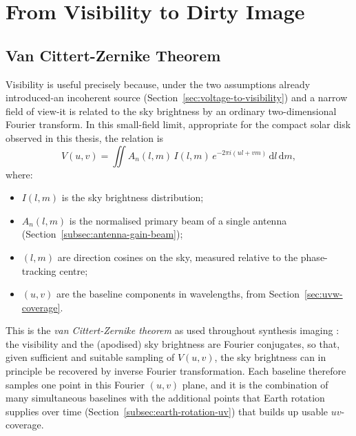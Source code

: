 \section{From Visibility to Dirty Image}
\label{sec:visibility-to-image}

\subsection{Van Cittert-Zernike Theorem}
\label{subsec:vcz}
Visibility is useful precisely because, under the two assumptions already
introduced-an incoherent source (Section~\ref{sec:voltage-to-visibility}) and
a narrow field of view-it is related to the sky brightness by an ordinary
two-dimensional Fourier transform. In this small-field limit, appropriate for
the compact solar disk observed in this thesis, the relation is
\begin{equation}
  V(u,v) = \iint A_n(l,m)\,I(l,m)\,e^{-2\pi i(ul+vm)}\,\mathrm{d}l\,\mathrm{d}m ,
  \label{eq:vcz}
\end{equation}
where:
\begin{itemize}[leftmargin=1.5em,itemsep=1pt,topsep=2pt]
  \item $I(l,m)$ is the sky brightness distribution;
  \item $A_n(l,m)$ is the normalised primary beam of a single antenna
        (Section~\ref{subsec:antenna-gain-beam});
  \item $(l,m)$ are direction cosines on the sky, measured relative to the
        phase-tracking centre;
  \item $(u,v)$ are the baseline components in wavelengths, from
        Section~\ref{sec:uvw-coverage}.
\end{itemize}
This is the \emph{van Cittert-Zernike theorem} as used throughout synthesis
imaging \citep{taylor1999synthesis,tms2017}: the visibility and the (apodised)
sky brightness are Fourier conjugates, so that, given sufficient and suitable
sampling of $V(u,v)$, the sky brightness can in principle be recovered by
inverse Fourier transformation. Each baseline therefore samples one point in
this Fourier $(u,v)$ plane, and it is the combination of many simultaneous
baselines with the additional points that Earth rotation supplies over time
(Section~\ref{subsec:earth-rotation-uv}) that builds up usable $uv$-coverage.

